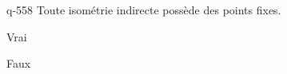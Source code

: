 \begin{truefalse}{q-558}
Toute isométrie indirecte possède des points fixes.
\item Vrai
\item* Faux
\end{truefalse}

